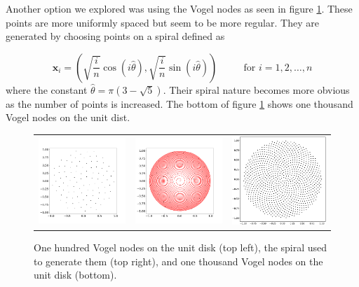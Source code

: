 \documentclass[12pt]{article}
\let\vec\mathbf
\begin{document}
Another option we explored was using the Vogel nodes as seen in figure \ref{vogel}. These points are more uniformly spaced but seem to be more regular. They are generated by choosing points on a spiral defined as

$$
\vec{x}_i = \left( \sqrt{\frac{i}{n}}\cos(i\hat{\theta}), \sqrt{\frac{i}{n}}\sin(i\hat{\theta})  \right) \phantom{==}\text{for } i = 1, 2, \dots, n
$$
where the constant $\hat{\theta} = \pi (3-\sqrt{5})$. Their spiral nature becomes more obvious as the number of points is increased. The bottom of figure \ref{vogel} shows one thousand Vogel nodes on the unit dist.

\begin{figure}
	\centering
	\begin{tabular}{ccc}
		\includegraphics[width=.3\textwidth]{vogel_no_spiral.png} & \includegraphics[width=.3\textwidth]{vogel_spiral.png} &
		\includegraphics[width=.3\textwidth]{vogel_1000_disk.eps} 
	\end{tabular}
	\caption{One hundred Vogel nodes on the unit disk (top left), the spiral used to generate them (top right), and one thousand Vogel nodes on the unit disk (bottom).}
	\label{vogel}
\end{figure}
\end{document}
